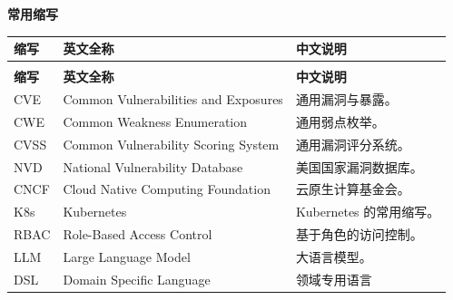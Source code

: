 \vspace{0.35em}

\noindent\textbf{常用缩写}

\begingroup
\small
\setlength{\tabcolsep}{4pt}
\renewcommand{\arraystretch}{0.88}
\begin{longtable}{>{\centering\arraybackslash}p{2cm} >{\raggedright\arraybackslash}p{5.5cm} >{\raggedright\arraybackslash}p{5.7cm}}
\toprule
\textbf{缩写} & \textbf{英文全称} & \textbf{中文说明} \\
\midrule
\endfirsthead
\multicolumn{3}{c}{\small\textbf{常用缩写（续）}} \\[0.3ex]
\toprule
\textbf{缩写} & \textbf{英文全称} & \textbf{中文说明} \\
\midrule
\endhead
\midrule
\endfoot
\bottomrule
\endlastfoot
CVE & Common Vulnerabilities and Exposures & 通用漏洞与暴露。 \\
CWE & Common Weakness Enumeration & 通用弱点枚举。 \\
CVSS & Common Vulnerability Scoring System & 通用漏洞评分系统。 \\
NVD & National Vulnerability Database & 美国国家漏洞数据库。 \\
CNCF & Cloud Native Computing Foundation & 云原生计算基金会。 \\
K8s & Kubernetes & Kubernetes 的常用缩写。 \\
RBAC & Role-Based Access Control & 基于角色的访问控制。 \\
LLM & Large Language Model & 大语言模型。 \\
DSL & Domain Specific Language & 领域专用语言\\
\end{longtable}
\endgroup

\endgroup

